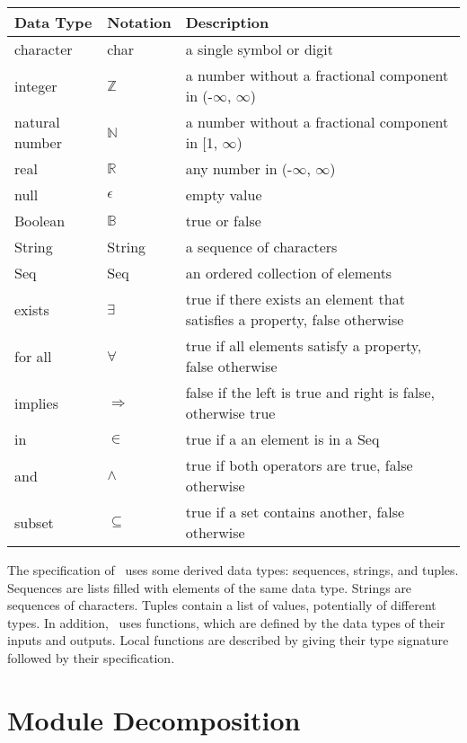 \documentclass[12pt, titlepage]{article}
\begin{document}
\begin{center}
\renewcommand{\arraystretch}{1.2}
\noindent 
\begin{tabular}{l l p{7.5cm}} 
\toprule 
\textbf{Data Type} & \textbf{Notation} & \textbf{Description}\\ 
\midrule
character & char & a single symbol or digit\\
integer & $\mathbb{Z}$ & a number without a fractional component in (-$\infty$,
$\infty$) \\
natural number & $\mathbb{N}$ & a number without a fractional component in [1,
$\infty$) \\
real & $\mathbb{R}$ & any number in (-$\infty$, $\infty$)\\
null & $\epsilon$ & empty value \\
Boolean & $\mathbb{B}$ & true or false\\
String & String & a sequence of characters\\
Seq & Seq & an ordered collection of elements\\
exists & $\exists$ & true if there exists an element that satisfies a property,
false otherwise\\
for all & $\forall$ & true if all elements satisfy a property, false otherwise\\
implies & $\Rightarrow$ & false if the left is true and right is false,
otherwise true\\
in & $\in$ & true if a an element is in a Seq\\
and & $\land$ & true if both operators are true, false otherwise\\
subset & $\subseteq$ & true if a set contains another, false otherwise\\
\bottomrule
\end{tabular} 
\end{center}

\noindent
The specification of \progname \ uses some derived data types: sequences,
strings, and tuples. Sequences are lists filled with elements of the same data
type. Strings are sequences of characters. Tuples contain a list of values,
potentially of different types. In addition, \progname \ uses functions, which
are defined by the data types of their inputs and outputs. Local functions are
described by giving their type signature followed by their specification.

\newpage
\section{Module Decomposition}
\end{document}
